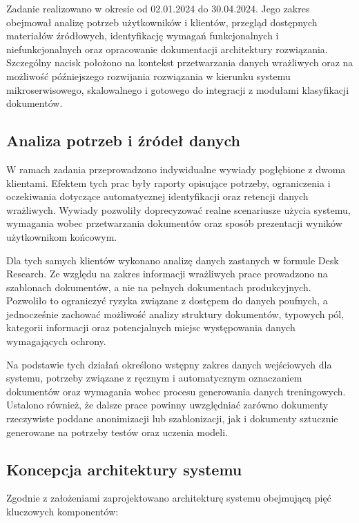 \documentclass[12pt,a4paper]{report}
\begin{document}
Zadanie realizowano w okresie od 02.01.2024 do 30.04.2024. Jego zakres obejmował analizę potrzeb użytkowników i klientów, przegląd dostępnych materiałów źródłowych, identyfikację wymagań funkcjonalnych i niefunkcjonalnych oraz opracowanie dokumentacji architektury rozwiązania. Szczególny nacisk położono na kontekst przetwarzania danych wrażliwych oraz na możliwość późniejszego rozwijania rozwiązania w kierunku systemu mikroserwisowego, skalowalnego i gotowego do integracji z modułami klasyfikacji dokumentów.

\subsection{Analiza potrzeb i źródeł danych}
W ramach zadania przeprowadzono indywidualne wywiady pogłębione z dwoma klientami. Efektem tych prac były raporty opisujące potrzeby, ograniczenia i oczekiwania dotyczące automatycznej identyfikacji oraz retencji danych wrażliwych. Wywiady pozwoliły doprecyzować realne scenariusze użycia systemu, wymagania wobec przetwarzania dokumentów oraz sposób prezentacji wyników użytkownikom końcowym.

Dla tych samych klientów wykonano analizę danych zastanych w formule Desk Research. Ze względu na zakres informacji wrażliwych prace prowadzono na szablonach dokumentów, a nie na pełnych dokumentach produkcyjnych. Pozwoliło to ograniczyć ryzyka związane z dostępem do danych poufnych, a jednocześnie zachować możliwość analizy struktury dokumentów, typowych pól, kategorii informacji oraz potencjalnych miejsc występowania danych wymagających ochrony.

Na podstawie tych działań określono wstępny zakres danych wejściowych dla systemu, potrzeby związane z ręcznym i automatycznym oznaczaniem dokumentów oraz wymagania wobec procesu generowania danych treningowych. Ustalono również, że dalsze prace powinny uwzględniać zarówno dokumenty rzeczywiste poddane anonimizacji lub szablonizacji, jak i dokumenty sztucznie generowane na potrzeby testów oraz uczenia modeli.

\subsection{Koncepcja architektury systemu}
Zgodnie z założeniami zaprojektowano architekturę systemu obejmującą pięć kluczowych komponentów:
\end{document}
